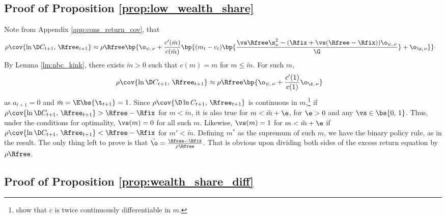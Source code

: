 \subsection{Proof of Proposition \ref{prop:low_wealth_share}}\label{pf:low_wealth_share}

Note from Appendix \ref{app:cons_return_cov}, that
\begin{align*}
    \rho\cov{\ln \D C_{t+1},\,\Rfree_{t+1}} &\approx \rho\Rfree\bp{\o_{\psi,\,\nu} + \frac{c'(\bar{m})}{c(\bar{m})}\bp{(m_t - c_t)\bp{\frac{\vs\Rfree\s_{\nu}^2 - (\Rfix + \vs(\Rfree - \Rfix))\o_{\psi,\,\nu}}{\G}} + \o_{\z,\,\nu}}}
\end{align*}
By Lemma \ref{lm:nbc_kink}, there exists $\tilde{m} > 0$ such that $c(m) = m$ for $m \leq \tilde{m}$. For such $m$,
\begin{align*}
    \rho\cov{\ln \D C_{t+1},\,\Rfree_{t+1}} &\approx \rho\Rfree\bp{\o_{\psi,\,\nu} + \frac{c'(1)}{c(1)}\o_{\z,\,\nu}}
\end{align*}
as $a_{t+1} = 0$ and $\bar{m} = \E\bs{\t_{t+1}} = 1$. Since $\rho\cov{\D\ln C_{t+1},\,\Rfree_{t+1}}$ is continuous in $m$,\footnote{\citet{Carroll2024b} show that $c$ is twice continuously differentiable in $m$.} if $\rho\cov{\ln \D C_{t+1},\,\Rfree_{t+1}} > \Rfree - \Rfix$ for $m < \tilde{m}$, it is also  true for $m < \tilde{m} + \e$, for $\e > 0$ and any $\vs \in \bs{0,\,1}$. Thus, under the conditions for optimality, $\vs(m) = 0$ for all such $m$. Likewise, $\vs(m) = 1$ for $m < \tilde{m} + \e$ if $\rho\cov{\ln \D C_{t+1},\,\Rfree_{t+1}} < \Rfree - \Rfix$ for $m' < \tilde{m}$. Defining $m^*$ as the supremum of such $m$, we have the binary policy rule, as in the result. The only thing left to prove is that $\tilde{\o} = \frac{\Rfree - \Rfix}{\rho\Rfree}$. That is obvious upon dividing both sides of the excess return equation by $\rho\Rfree$.

\subsection{Proof of Proposition \ref{prop:wealth_share_diff}}\label{pf:wealth_share_diff}



